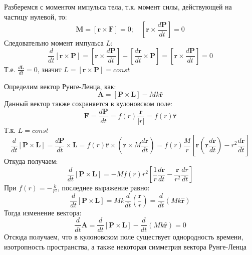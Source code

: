 \documentclass[a4paper,14pt]{article}
\begin{document}
Разберемся с моментом импульса тела, т.к. момент силы, действующей на частицу нулевой, то:
\begin{equation*}
\mathbf {M} = [\mathbf r \times \mathbf F ] = 0 ; \quad  [\mathbf r \times \frac{d \mathbf P}{dt} ] = 0
\end{equation*}
Следовательно момент импульса $L$:
\begin{equation*}
\frac{d}{dt} [\mathbf r \times \mathbf P ] = [\mathbf r \times \frac{d \mathbf P}{dt} ] +  [\frac{d\mathbf r}{dt} \times \mathbf P] = [\mathbf r \times \frac{d \mathbf P}{dt} ] = 0
\end{equation*}
Т.е. $\frac{d\mathbf L}{dt} = 0$, значит $L = [\mathbf r \times \mathbf P ]= const$

Определим вектор Рунге-Ленца, как:
\begin{equation*}
\mathbf A = [\mathbf P \times \mathbf L] - Mk\widehat{\mathbf r}
\end{equation*}
Данный вектор также сохраняется в кулоновском поле:
\begin{equation*}
\mathbf F =\frac{d \mathbf P}{dt} = f(r)\frac{\mathbf r}{|r|} = f(r)\widehat{\mathbf r}
\end{equation*}
Т.к. $L = const$
\begin{equation*}
\frac{d}{dt} [\mathbf P \times \mathbf L ] = \frac{d \mathbf P}{dt} \times \mathbf L =  f(r)\widehat{\mathbf r} \times \left(\mathbf r \times M \frac{d\mathbf r}{dt} \right) =  f(r)\frac{M}{r}\left[ \mathbf r\left(\mathbf r \frac{d\mathbf r}{dt}\right) - r^2\frac{d\mathbf r}{dt} \right]
\end{equation*}
Откуда получаем:
\begin{equation*}
\frac{d}{dt} [\mathbf P \times \mathbf L ] = -M f(r) r^2 \left[\frac{1}{r}\frac{d\mathbf r}{dt} - \frac{\mathbf r}{r^2}\frac{dr}{dt}  \right]
\end{equation*}
При $f(r) = -\frac{k}{r^2}$, последнее выражение равно:
\begin{equation*}
\frac{d}{dt} [\mathbf P \times \mathbf L ] = Mk\frac{d}{dt}\left( \frac{\mathbf r}{r}\right) = \frac{d}{dt}(Mk\widehat{\mathbf r})
\end{equation*}
Тогда изменение вектора:
\begin{equation*}
\frac{d}{dt}\mathbf A = \frac{d}{dt} [\mathbf P \times \mathbf L ] - \frac{d}{dt}(Mk\widehat{\mathbf r}) = 0
\end{equation*}
Отсюда получаем, что в кулоновском поле существует однородность времени, изотропность пространства, а также некоторая симметрия вектора Рунге-Ленца
\end{document}
